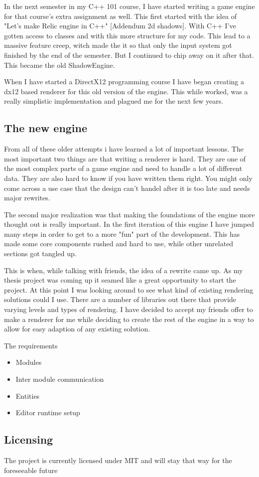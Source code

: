 In the next semester in my C++ 101 course, I have started writing a game engine for that course's extra assignment as well. This first started with the idea of "Let's make Relic engine in C++" [Addendum 2d shadows].
With C++ I've gotten access to classes and with this more structure for my code.
This lead to a massive feature creep, witch made the it so that only the input system got finished by the end of the semester. But I continued to chip away on it after that. This became the old ShadowEngine.

When I have started a DirectX12 programming course I have began creating a dx12 based renderer for this old version of the engine. This while worked, was a really simplistic implementation and plagued me for the next few years.

\subsection{The new engine}

From all of these older attempts i have learned a lot of important lessons. The most important two things are that writing a renderer is hard. They are one of the most complex parts of a game engine and need to handle a lot of different data. They are also hard to know if you have written them right. You might only come across a use case that the design can't handel after it is too late and needs major rewrites. 

The second major realization was that making the foundations of the engine more thought out is really important. In the first iteration of this engine I have jumped many steps in order to get to a more "fun" part of the development. This has made some core components rushed and hard to use, while other unrelated sections got tangled up.

This is when, while talking with friends, the idea of a rewrite came up. As my thesis project was coming up it seamed like a great opportunity to start the project. At this point I was looking around to see what kind of existing rendering solutions could I use. There are a number of libraries out there that provide varying levels and types of rendering. I have decided to accept my friends offer to make a renderer for me while deciding to create the rest of the engine in a way to allow for easy adaption of any existing solution. 

The requirements
\begin{itemize}
    \item Modules
    \item Inter module communication
    \item Entities
    \item Editor runtime setup
\end{itemize}

\subsection{Licensing}

The project is currently licensed under MIT and will stay that way for the foreseeable future

